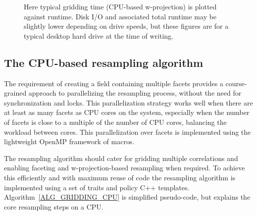 \begin{figure}[ht!]
 \begin{mdframed}
 \centering
  \caption{Here typical gridding time (CPU-based w-projection) is plotted against runtime. 
	   Disk I/O and associated total runtime may be slightly lower depending on 
	   drive speeds, but these figures are for a typical desktop hard drive at the time
	   of writing.}
  \label{FIG_GRIDDING_VS_RUNTIME}
  \end{mdframed}
\end{figure}

\subsection{The CPU-based resampling algorithm}
The requirement of creating a field containing multiple facets provides a course-grained approach to parallelizing the resampling process,
without the need for synchronization and locks. This parallelization strategy works well when there are at least as many facets as CPU cores 
on the system, especially when the number of facets is close to a multiple of the number of CPU cores, balancing the workload between cores. This
parallelization over facets is implemented using the lightweight OpenMP framework of macros.

The resampling algorithm should cater for gridding multiple correlations and enabling faceting and w-projection-based resampling when required.
To achieve this efficiently and with maximum reuse of code the resampling algorithm is implemented using a set of traits and policy C++ templates.
Algorithm~\ref{ALG_GRIDDING_CPU} is simplified pseudo-code, but explains the core resampling steps on a CPU.

